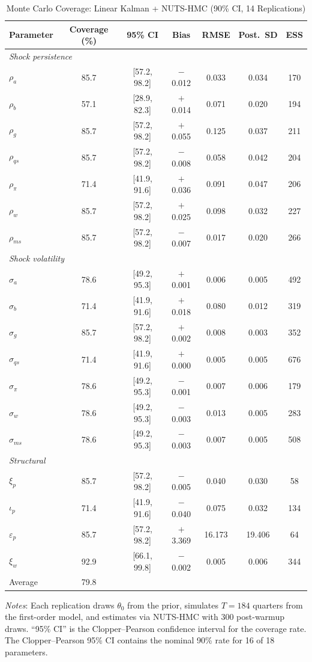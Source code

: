 \documentclass[12pt]{article}
\theoremstyle{plain}
\theoremstyle{definition}
\theoremstyle{remark}
\newcommand{\tablenotes}[1]{%
  \par\vspace{0.5em}%
  \noindent\begin{minipage}{\textwidth}%
  \raggedright\footnotesize #1%
  \end{minipage}\par%
}
\begin{document}
\begin{table}[htbp]
\centering
\caption{Monte Carlo Coverage: Linear Kalman + NUTS-HMC (90\% CI, 14 Replications)}
\label{tab:mc_coverage_linear}
\begin{tabular}{lcccccc}
\toprule
Parameter & Coverage (\%) & 95\% CI & Bias & RMSE & Post.\ SD & ESS \\
\midrule
\multicolumn{7}{l}{\textit{Shock persistence}} \\
$\rho_a$ & 85.7 & [57.2, 98.2] & $-$0.012 & 0.033 & 0.034 & 170 \\
$\rho_b$ & 57.1 & [28.9, 82.3] & $+$0.014 & 0.071 & 0.020 & 194 \\
$\rho_g$ & 85.7 & [57.2, 98.2] & $+$0.055 & 0.125 & 0.037 & 211 \\
$\rho_{qs}$ & 85.7 & [57.2, 98.2] & $-$0.008 & 0.058 & 0.042 & 204 \\
$\rho_\pi$ & 71.4 & [41.9, 91.6] & $+$0.036 & 0.091 & 0.047 & 206 \\
$\rho_w$ & 85.7 & [57.2, 98.2] & $+$0.025 & 0.098 & 0.032 & 227 \\
$\rho_{ms}$ & 85.7 & [57.2, 98.2] & $-$0.007 & 0.017 & 0.020 & 266 \\
\midrule
\multicolumn{7}{l}{\textit{Shock volatility}} \\
$\sigma_a$ & 78.6 & [49.2, 95.3] & $+$0.001 & 0.006 & 0.005 & 492 \\
$\sigma_b$ & 71.4 & [41.9, 91.6] & $+$0.018 & 0.080 & 0.012 & 319 \\
$\sigma_g$ & 85.7 & [57.2, 98.2] & $+$0.002 & 0.008 & 0.003 & 352 \\
$\sigma_{qs}$ & 71.4 & [41.9, 91.6] & $+$0.000 & 0.005 & 0.005 & 676 \\
$\sigma_\pi$ & 78.6 & [49.2, 95.3] & $-$0.001 & 0.007 & 0.006 & 179 \\
$\sigma_w$ & 78.6 & [49.2, 95.3] & $-$0.003 & 0.013 & 0.005 & 283 \\
$\sigma_{ms}$ & 78.6 & [49.2, 95.3] & $-$0.003 & 0.007 & 0.005 & 508 \\
\midrule
\multicolumn{7}{l}{\textit{Structural}} \\
$\xi_p$ & 85.7 & [57.2, 98.2] & $-$0.005 & 0.040 & 0.030 & 58 \\
$\iota_p$ & 71.4 & [41.9, 91.6] & $-$0.040 & 0.075 & 0.032 & 134 \\
$\varepsilon_p$ & 85.7 & [57.2, 98.2] & $+$3.369 & 16.173 & 19.406 & 64 \\
$\xi_w$ & 92.9 & [66.1, 99.8] & $-$0.002 & 0.005 & 0.006 & 344 \\
\midrule
Average & 79.8 & & & & & \\
\bottomrule
\end{tabular}
\smallskip
\tablenotes{\textit{Notes}: Each replication draws $\theta_0$ from the prior, simulates $T = 184$ quarters from the first-order model, and estimates via NUTS-HMC with 300 post-warmup draws. ``95\% CI'' is the Clopper--Pearson confidence interval for the coverage rate. The Clopper--Pearson 95\% CI contains the nominal 90\% rate for 16 of 18 parameters.}
\end{table}
\end{document}
